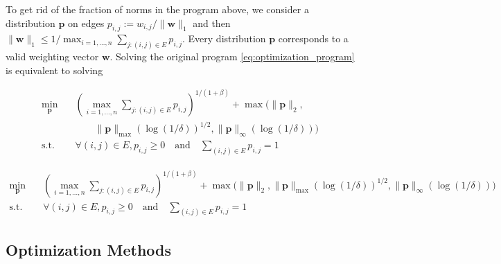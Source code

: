 \documentclass[letterpaper]{article} %
\def\DoubleColumn{}
\def\DoubleColumnEnd{}
\def\SingleColumn{}
\def\SingleColumnEnd{}
\newcommand{\weight}{\mathbf{w}}
\newcommand{\probdistri}{\mathbf{p}}
\newcommand{\pair}[1]{(#1)}
\newcommand{\normo}[1]{\|#1\|_1}
\newcommand{\complexbound}{\beta}
\begin{document}
To get rid of the fraction of norms in the program above, we consider a distribution $\probdistri{}$ on edges $p_{i,j}:=w_{i,j}/\normo{\weight{}}$ and then 
$\normo{\weight{}} \le 1/\max_{i=1,\dots,n} \sum_{j:\pair{i,j}\in E} p_{i,j}.$
Every distribution $\probdistri{}$ corresponds to a valid weighting vector $\weight{}$. 
Solving the original program \eqref{eq:optimization_program} is equivalent to solving
\DoubleColumn
\begin{equation}
    \label{eq:optimization_program_1}
\begin{aligned}
    \min_{\probdistri{}} \quad&
    (\max_{i=1,\dots,n} \sum_{j:\pair{i,j}\in E} p_{i,j})^{1/(1+\complexbound{})}+\max\Big(\|\probdistri{}\|_2,\\
    &\qquad\|\probdistri{}\|_{\max}(\log(1/\delta))^{1/2},
    \|\probdistri{}\|_\infty(\log(1/\delta))\Big)\\
    \mbox{s.t.} \quad& \forall \pair{i,j}\in E, p_{i,j}\ge 0 \quad \mbox{and} \quad \sum_{\pair{i,j}\in E} p_{i,j}= 1
\end{aligned}
\end{equation}
\DoubleColumnEnd
\SingleColumn
\begin{equation}
    \label{eq:optimization_program_1}
\begin{aligned}
    \min_{\probdistri{}} &\quad
    (\max_{i=1,\dots,n} \sum_{j:\pair{i,j}\in E} p_{i,j})^{1/(1+\complexbound{})}+\max\Big(\|\probdistri{}\|_2,\|\probdistri{}\|_{\max}(\log(1/\delta))^{1/2},
    \|\probdistri{}\|_\infty(\log(1/\delta))\Big)\\
    \mbox{s.t.} &\quad \forall \pair{i,j}\in E, p_{i,j}\ge 0 \quad \mbox{and} \quad \sum_{\pair{i,j}\in E} p_{i,j}= 1
\end{aligned}
\end{equation}
\SingleColumnEnd


\subsection{Optimization Methods} %
\label{sub:optimization}
\end{document}
